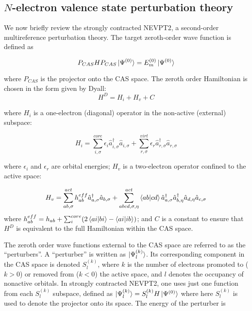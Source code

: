 \subsection{$N$-electron valence state perturbation theory} 

We now briefly review the strongly contracted NEVPT2\cite{angeli_n-electron_2001, angeli_n-electron_2002}, a second-order 
multireference perturbation theory. The target zeroth-order wave function is defined as 

\begin{equation}
P_{CAS}HP_{CAS} \ket{\Psi^{(0)}} = E^{(0)}_m \ket{\Psi^{(0)}}
\end{equation}

where $P_{CAS}$ is the projector onto the CAS space. 
The zeroth order Hamiltonian is chosen in the form given by Dyall\cite{dyall_choice_1995}:
\begin{equation}
  H^D = H_i + H_v + C
\end{equation}

where $H_i$ is a one-electron (diagonal) operator in the non-active (external) subspace:

\begin{equation}
  H_i = \sum_{i,\sigma}^{core} \epsilon_i \hat{a}^\dagger_{i,\sigma}\hat{a}_{i,\sigma} + \sum_{r,\sigma}^{virt} \epsilon_r \hat{a}^\dagger_{r,\sigma}\hat{a}_{r,\sigma}
\end{equation}

where $\epsilon_i $ and $\epsilon_r$ are orbital energies; 
$H_v$ is a two-electron operator confined to the active space:

\begin{equation}
  H_v = \sum_{ab,\sigma}^{act} h^{eff}_{ab} \hat{a}^\dagger_{a,\sigma} \hat{a}_{b,\sigma} + \sum_{abcd,\sigma,\eta}^{act} \braket{ab|cd} \hat{a}^\dagger_{a,\sigma}\hat{a}^\dagger_{b,\eta}\hat{a}_{d,\eta}\hat{a}_{c,\sigma}
\end{equation}
where $h_{ab}^{eff} = h_{ab} + \sum_{i}^{core} (2\braket{ai|bi}-\braket{ai|ib})$;
and $C$ is a constant to ensure that $H^D$ is equivalent to the full Hamiltonian within the CAS space.

The zeroth order wave functions external to the CAS space are referred to as the ``perturbers''. A ``perturber'' is written  as $\ket{\Psi^{(k)}_{l}}$.
Its corresponding component in the CAS space is denoted $S_l^{(k)}$, where $k$ is the number of electrons promoted to ($k>0$) or removed from ($k<0$) the active space, and $l$ denotes the occupancy of nonactive orbitals. 
In strongly contracted NEVPT2, one uses just one function from each $S_l^{(k)}$ subspace, defined as $\ket{\Psi^{(k)}_l} = S^{(k)}_l H \ket{\Psi^{(0)}}$ where here $S_l^{(k)}$ is used to denote the projector onto its space. The energy of
the perturber is

